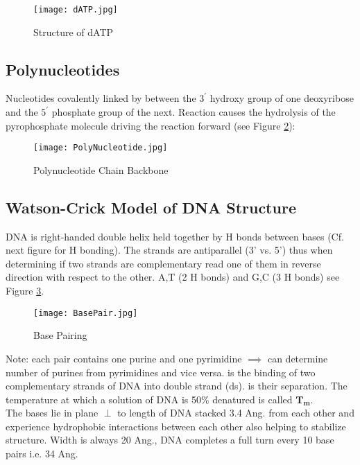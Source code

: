 \documentclass[../Bio_chemistryReview.tex]{subfiles}
\begin{document}
\begin{figure}[h]
  \centering
  \texttt{[image: dATP.jpg]}
  \caption{Structure of dATP}
  \label{fig:dATP}
\end{figure}

\subsection{Polynucleotides}
Nucleotides covalently linked by  between the $
3^{\prime} $ hydroxy group of one deoxyribose and the $ 5^{\prime} $ phosphate
group of the next. Reaction causes the hydrolysis of the pyrophosphate molecule
driving the reaction forward (see Figure \ref{fig:Poly}):

\begin{figure}[H]
  \centering
  \texttt{[image: PolyNucleotide.jpg]}
  \caption{Polynucleotide Chain Backbone}
  \label{fig:Poly}
\end{figure}

\subsection{Watson-Crick Model of DNA Structure}
DNA is right-handed double helix held together by H bonds between bases (Cf.
next figure for H bonding). The strands are antiparallel (3' vs. 5') thus when
determining if two strands are complementary read one of them in reverse
direction with respect to the other. A,T (2 H bonds) and G,C (3 H bonds) see
Figure \ref{fig:bp}.
\begin{figure}[h]
  \centering
  \texttt{[image: BasePair.jpg]}
  \caption{Base Pairing}
  \label{fig:bp}
\end{figure}

Note: each pair contains one purine and one pyrimidine $ \implies $ can
determine number of purines from pyrimidines and vice versa.  is the binding of two complementary strands of DNA into double
strand (ds).  is their separation. The temperature at which
a solution of DNA is 50\% denatured is called $ \boldsymbol{ T_{m} } $.\\
The bases lie in plane $ \perp $ to length of DNA stacked 3.4 Ang. from each
other and experience hydrophobic interactions between each other also helping to
stabilize structure. Width is always 20 Ang., DNA completes a full turn every 10
base pairs i.e. 34 Ang. 
\end{document}
